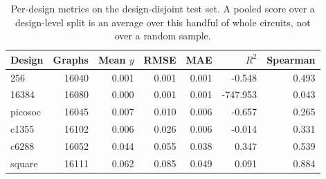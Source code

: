 \begin{table}[htbp]
\centering
\caption{Per-design metrics on the design-disjoint test set. A pooled score over a design-level split is an average over this handful of whole circuits, not over a random sample.}
\label{tab:rq1_per_design}
\small
\begin{tabular}{lrrrrrr}
\toprule
\textbf{Design} & \textbf{Graphs} & \textbf{Mean $y$} & \textbf{RMSE} & \textbf{MAE} & \textbf{$R^2$} & \textbf{Spearman} \\
\midrule
256 & 16040 & 0.001 & 0.001 & 0.001 & -0.548 & 0.493 \\
16384 & 16080 & 0.000 & 0.001 & 0.001 & -747.953 & 0.043 \\
picosoc & 16045 & 0.007 & 0.010 & 0.006 & -0.657 & 0.265 \\
c1355 & 16102 & 0.006 & 0.026 & 0.006 & -0.014 & 0.331 \\
c6288 & 16052 & 0.044 & 0.055 & 0.038 & 0.347 & 0.539 \\
square & 16111 & 0.062 & 0.085 & 0.049 & 0.091 & 0.884 \\
\bottomrule
\end{tabular}
\end{table}
